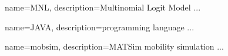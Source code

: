 
{
    name=MNL,
    description={Multinomial Logit Model ...}
}

{
    name=JAVA,
    description={programming language ...}
}

{
    name=mobsim,
    description={MATSim mobility simulation ...}
}


%
%
